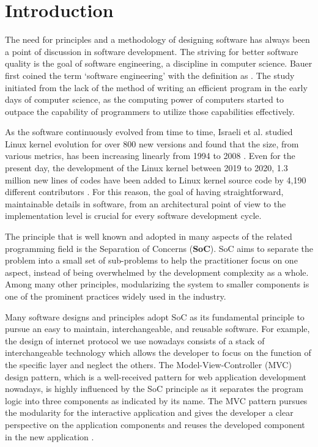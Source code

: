 \chapter*{Introduction}
The need for principles and a methodology of designing software has always been a point of discussion in software development. The striving for better software quality is the goal of software engineering, a discipline in computer science. Bauer \cite{DBLP:conf/ifip/Bauer71} first coined the term ‘software engineering’ with the definition as . The study initiated from the lack of the method of writing an efficient program in the early days of computer science, as the computing power of computers started to outpace the capability of programmers to utilize those capabilities effectively.

As the software continuously evolved from time to time, Israeli et al. studied Linux kernel evolution for over 800 new versions and found that the size, from various metrics, has been increasing linearly from 1994 to 2008 \cite{10.1016/j.jss.2009.09.042}. Even for the present day, the development of the Linux kernel between 2019 to 2020, 1.3 million new lines of codes have been added to Linux kernel source code by 4,190 different contributors \cite{anderson2020}. For this reason, the goal of having straightforward, maintainable details in software, from an architectural point of view to the implementation level is crucial for every software development cycle.

The principle that is well known and adopted in many aspects of the related programming field is the Separation of Concerns (\textbf{SoC}). SoC aims to separate the problem into a small set of sub-problems to help the practitioner focus on one aspect, instead of being overwhelmed by the development complexity as a whole. Among many other principles, modularizing the system to smaller components is one of the prominent practices widely used in the industry.

Many software designs and principles adopt SoC as its fundamental principle to pursue an easy to maintain, interchangeable, and reusable software. For example, the design of internet protocol we use nowadays consists of a stack of interchangeable technology which allows the developer to focus on the function of the specific layer and neglect the others\cite{stack-1994}. The Model-View-Controller (MVC) design pattern, which is a well-received pattern for web application development nowadays, is highly influenced by the SoC principle as it separates the program logic into three components as indicated by its name. The MVC pattern pursues the modularity for the interactive application and gives the developer a clear perspective on the application components and reuses the developed component in the new application \cite{GlennACF}.

